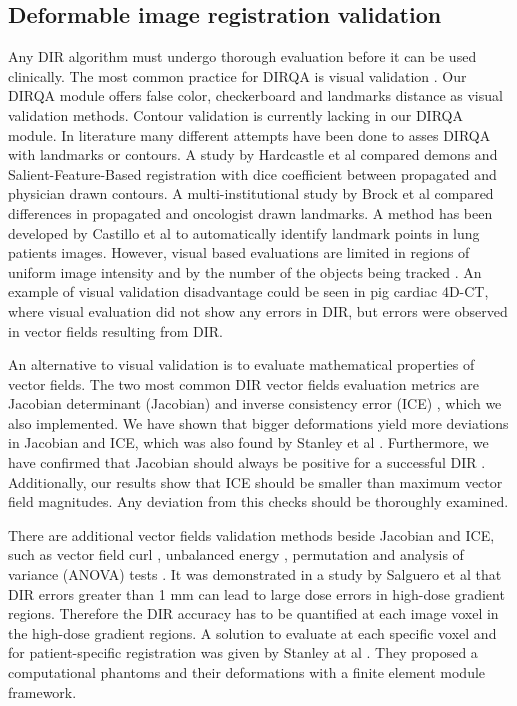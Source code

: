 \documentclass[type=dr, dr=rernat, accentcolor=tud7b,colorbacktitle, bigchapter, openright, twoside, 12pt ]{tudthesis}
\begin{document}
\subsection{Deformable image registration validation}

Any DIR algorithm must undergo thorough evaluation before it can be used clinically. The most common practice for DIRQA is visual validation \cite{Stanley2013}. Our DIRQA module offers false color, checkerboard and landmarks distance as
visual validation methods. Contour validation is currently lacking in our DIRQA module. In literature many different attempts have been done to asses DIRQA with landmarks or contours. A study by Hardcastle et al \cite{Hardcastle2012} 
compared demons and Salient-Feature-Based registration with dice coefficient between propagated and physician drawn contours.
A multi-institutional study by Brock et al \cite{Brock2010} compared differences in propagated and oncologist drawn landmarks. A method has been developed by Castillo et al \cite{Castillo2009} to automatically identify landmark points
in lung patients images. However, visual based evaluations are limited in regions of uniform image intensity and by the number of the objects being tracked \cite{Kashani2008, Liu2012}. An example of visual validation disadvantage could be seen in
pig cardiac 4D-CT, where visual evaluation did not show any errors in DIR, but errors were observed in vector fields resulting from DIR.

An alternative to visual validation is to evaluate mathematical properties of vector fields. The two most common DIR vector fields evaluation metrics are Jacobian determinant (Jacobian) and inverse consistency error (ICE) \cite{Leow2007, Christensen2001},
which we also implemented. We have shown that bigger deformations yield more deviations in Jacobian and ICE, which was also found by Stanley et al \cite{Stanley2013}. Furthermore, we have confirmed
that Jacobian should always be positive for a successful DIR \cite{Rey2002}. Additionally, our results show that ICE should be smaller than maximum vector field magnitudes. Any deviation from this checks should be thoroughly examined.

There are additional vector fields validation methods beside Jacobian and ICE, such as vector field curl \cite{Schreibmann2012}, unbalanced energy \cite{Zhong2007}, permutation and analysis of variance (ANOVA) tests \cite{Klein2009}.
It was demonstrated in a study by Salguero et al that DIR errors greater than 1 mm can lead to large dose errors in high-dose gradient regions. Therefore the DIR accuracy has to be quantified at each image voxel in the high-dose 
gradient regions. A solution to evaluate at each specific voxel and for patient-specific registration was given by Stanley at al \cite{Stanley2013}. They proposed a computational phantoms and their deformations with a finite element module framework. 
\end{document}
